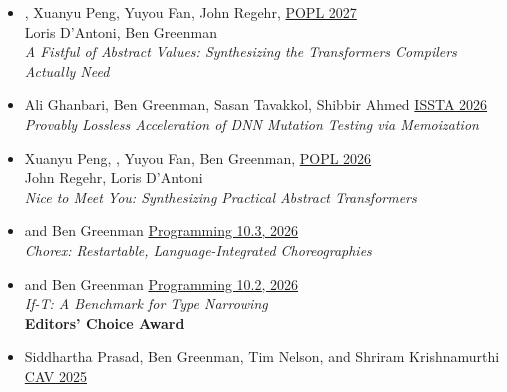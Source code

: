 \documentclass[11pt]{article}
\begin{document}
\begin{itemize}
    \whenrpt{

  }


\item
  , Xuanyu Peng, Yuyou Fan, John Regehr,
    \hfill \href{}{POPL 2027} \\
   Loris D'Antoni, Ben Greenman      \\
    \emph{A Fistful of Abstract Values: Synthesizing the Transformers Compilers Actually Need} \hfill {}
\item
  Ali Ghanbari, Ben Greenman, Sasan Tavakkol, Shibbir Ahmed \hfill \href{https://conf.researchr.org/details/issta-2026/issta-2026-research-papers/161/Provably-Lossless-Acceleration-of-DNN-Mutation-Testing-via-Memoization}{ISSTA 2026} \\
    \emph{Provably Lossless Acceleration of DNN Mutation Testing via Memoization} \hfill {}
\item
  Xuanyu Peng, , Yuyou Fan, Ben Greenman, \hfill \href{https://popl26.sigplan.org/details/POPL-2026-popl-research-papers/82/Nice-to-Meet-You-Synthesizing-Practical-MLIR-Abstract-Transformers}{POPL 2026} \\
  John Regehr, Loris D'Antoni      \\
    \emph{Nice to Meet You: Synthesizing Practical Abstract Transformers} \hfill {}
\item
   and Ben Greenman \hfill \href{https://programming-journal.org/2025/10/20/}{Programming 10.3, 2026} \\
    \emph{Chorex: Restartable, Language-Integrated Choreographies} \hfill {}
\item
   and Ben Greenman \hfill \href{https://programming-journal.org/2025/10/17/}{Programming 10.2, 2026} \\
    \emph{If-T: A Benchmark for Type Narrowing} \hfill {}
    {\\\textbf{Editors' Choice Award}}
\item
  Siddhartha Prasad, Ben Greenman, Tim Nelson, and Shriram Krishnamurthi \hfill \href{https://conferences.i-cav.org/2025/}{CAV 2025} \\

\end{itemize}
\end{document}
